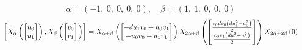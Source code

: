 \documentclass[11pt]{article}
\theoremstyle{definition}
\begin{document}
\[
\alpha = \left( -1, \  0, \  0, \  0, \  0\right), \quad \beta = \left( 1, \  1, \  0, \  0, \  0\right)
\]
\[
\scaletoalign{\textwidth}{\left[ X_{\alpha}\left(\left[\begin{matrix}u_{0}\\u_{1}\end{matrix}\right]\right), X_{\beta}\left(\left[\begin{matrix}v_{0}\\v_{1}\end{matrix}\right]\right) \right] = X_{\alpha + \beta}\left(\left[\begin{matrix}- d u_{1} v_{0} + u_{0} v_{1}\\- u_{0} v_{0} + u_{1} v_{1}\end{matrix}\right]\right) X_{2\alpha + \beta}\left(\left[\begin{matrix}\frac{c_{0} d v_{0} \left(d u_{1}^{2} - u_{0}^{2}\right)}{2}\\\frac{c_{0} v_{1} \left(d u_{1}^{2} - u_{0}^{2}\right)}{2}\end{matrix}\right]\right) X_{2\alpha + 2\beta}\left(0\right)}
\]
\end{document}

